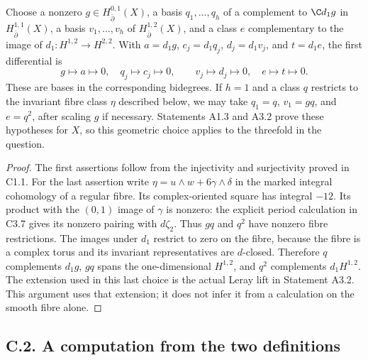 \begin{proposition}\label{inv:C1.2}
Choose a nonzero $g\in H^{0,1}_{\bar\partial}(X)$, a basis
$q_1,\ldots,q_h$ of a complement to $\C d_1g$ in
$H^{1,1}_{\bar\partial}(X)$, a basis $v_1,\ldots,v_h$ of
$H^{1,2}_{\bar\partial}(X)$, and a class $e$ complementary to the
image of $d_1:H^{1,2}\to H^{2,2}$.  With
$a=d_1g$, $c_j=d_1q_j$, $d_j=d_1v_j$, and $t=d_1e$, the first
differential is
\[
g\mapsto a\mapsto0,\quad q_j\mapsto c_j\mapsto0,
\qquad v_j\mapsto d_j\mapsto0,\quad e\mapsto t\mapsto0.
\]
These are bases in the corresponding bidegrees.  If $h=1$ and a
class $q$ restricts to the invariant fibre class $\eta$ described below,
we may take $q_1=q$, $v_1=gq$, and $e=q^2$, after scaling $g$ if
necessary.  Statements A1.3 and A3.2 prove these hypotheses for $X$,
so this geometric choice applies to the threefold in the question.
\end{proposition}
\begin{proof}
The first assertions follow from the injectivity and surjectivity
proved in C1.1.  For the last assertion write
$\eta=u\wedge w+6\gamma\wedge\delta$ in the marked integral
cohomology of a regular fibre.  Its complex-oriented square has
integral $-12$.  Its product with the $(0,1)$ image of $\gamma$ is
nonzero: the explicit period calculation in C3.7 gives its nonzero
pairing with $d\zeta_2$.  Thus $gq$ and $q^2$ have nonzero fibre
restrictions.  The images under $d_1$ restrict to zero on the fibre,
because the fibre is a complex torus and its invariant representatives
are $d$-closed.  Therefore $q$ complements $d_1g$, $gq$ spans the
one-dimensional $H^{1,2}$, and $q^2$ complements $d_1H^{1,2}$.
The extension used in this last choice is the actual Leray lift in
Statement A3.2.  This argument uses that extension; it does not infer
it from a calculation on the smooth fibre alone.
\end{proof}

\subsection{C.2. A computation from the two definitions}

